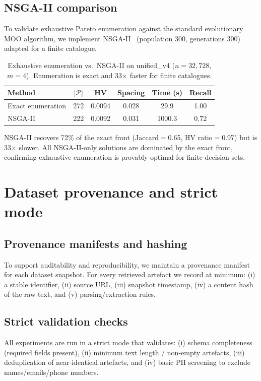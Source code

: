\documentclass[sigconf,review]{acmart}
\begin{document}
\subsection{NSGA-II comparison}
\label{sec:supp-nsga2}
To validate exhaustive Pareto enumeration against the standard evolutionary MOO algorithm, we implement NSGA-II~\cite{deb2002nsga2} (population 300, generations 300) adapted for a finite catalogue.

\begin{table}[htbp]
\centering
\caption{Exhaustive enumeration vs.\ NSGA-II on unified\_v4 ($n{=}32{,}728$, $m{=}4$). Enumeration is exact and 33$\times$ faster for finite catalogues.}
\label{tab:nsga2}
\begin{tabular}{lccccc}
\toprule
Method & $|\mathcal{P}|$ & HV & Spacing & Time (s) & Recall \\
\midrule
Exact enumeration & 272 & 0.0094 & 0.028 & 29.9 & 1.00 \\
NSGA-II & 222 & 0.0092 & 0.031 & 1000.3 & 0.72 \\
\bottomrule
\end{tabular}
\end{table}

NSGA-II recovers 72\% of the exact front (Jaccard$=$0.65, HV ratio$=$0.97) but is 33$\times$ slower. All NSGA-II-only solutions are dominated by the exact front, confirming exhaustive enumeration is provably optimal for finite decision sets.

\section{Dataset provenance and strict mode}
\subsection{Provenance manifests and hashing}
To support auditability and reproducibility, we maintain a provenance manifest for each dataset snapshot.
For every retrieved artefact we record at minimum:
(i) a stable identifier, (ii) source URL, (iii) snapshot timestamp, (iv) a content hash of the raw text, and (v) parsing/extraction rules.

\subsection{Strict validation checks}
All experiments are run in a strict mode that validates:
(i) schema completeness (required fields present),
(ii) minimum text length / non-empty artefacts,
(iii) deduplication of near-identical artefacts,
and (iv) basic PII screening to exclude names/emails/phone numbers.
\end{document}
